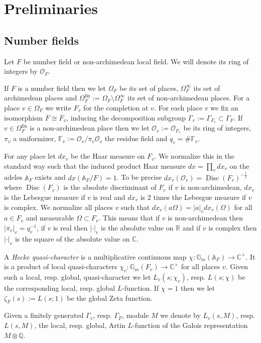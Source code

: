 \documentclass[a4paper,11pt,reqno]{amsart}
\newcommand{\Q}{\mathbb{Q}}
\newcommand{\R}{\mathbb{R}}
\newcommand{\C}{\mathbb{C}}
\newcommand{\F}{\mathbb{F}}
\newcommand{\G}{\mathbb{G}}
\newcommand{\A}{\mathbb{A}}
\DeclareMathOperator{\Disc}{Disc}
\theoremstyle{definition}
\begin{document}
\section{Preliminaries}
\subsection{Number fields}
Let $F$ be number field or non-archimedean local field. We will denote its ring of integers by $\mathcal{O}_F$.

If $F$ is a number field then we let $\Omega_F$ be its set of places, $\Omega_F^{\infty}$ its set of archimedean places and $\Omega_F^{\text{fin}} := \Omega_F \setminus \Omega_F^{\infty}$ its set of non-archimedean places. For a place $v \in \Omega_F$ we write $F_v$ for the completion at $v$. For each place $v$ we fix an isomorphism $\overline{F} \cong \overline{F}_v$, inducing the decomposition subgroup $\Gamma_v := \Gamma_{F_v} \subset \Gamma_F$. If $v \in \Omega_F^{\text{fin}}$ is a non-archimedean place then we let $\mathcal{O}_v := \mathcal{O}_{F_v}$ be its ring of integers, $\pi_v$ a uniformizer, $\F_v := \mathcal{O}_v/ \pi_v \mathcal{O}_v$ the residue field and $q_v = \# \F_v$. 

For any place let $dx_v$ be the Haar measure on $F_v$. We normalize this in the standard way such that the induced product Haar measure $dx = \prod_v d x_v$ on the adeles $\A_F$ exists and $dx(\A_F/F) = 1$. To be precise $dx_v(\mathcal{O}_v) = \Disc(F_v)^{-\frac{1}{2}}$ where $\Disc(F_v)$ is the absolute discriminant of $F_v$ if $v$ is non-archimedean, $dx_v$ is the Lebesgue measure if $v$ is real and $dx_v$ is $2$ times the Lebesgue measure if $v$ is complex. We normalize all places $v$ such that $dx_v( a \Omega) = |a|_v dx_v(\Omega)$ for all $a \in F_v$ and measurable $\Omega \subset F_v$. This means that if $v$ is non-archimedean then $|\pi_v|_v = q_v^{-1}$, if $v$ is real then $|\cdot|_v$ is the absolute value on $\R$ and if $v$ is complex then $|\cdot|_v$ is the square of the absolute value on $\C$. 

A \emph{Hecke quasi-character} is a multiplicative continuous map $\chi: \G_m(\A_F) \to \C^{\times}$. It is a product of local quasi-characters $\chi_v: \G_m(F_v) \to \C^{\times}$ for all places $v$. Given such a local, resp. global, quasi-character we let $L_v(s; \chi_v)$, resp. $L(s; \chi)$ be the corresponding local, resp. global $L$-function. If $\chi = 1$ then we let $\zeta_F(s) := L(s ; 1)$ be the global Zeta function.

Given a finitely generated $\Gamma_v$, resp. $\Gamma_F$, module $M$ we denote by $L_v(s, M)$, resp. $L(s, M)$, the local, resp. global, Artin $L$-function of the Galois representation $M \otimes \Q$.
\end{document}
